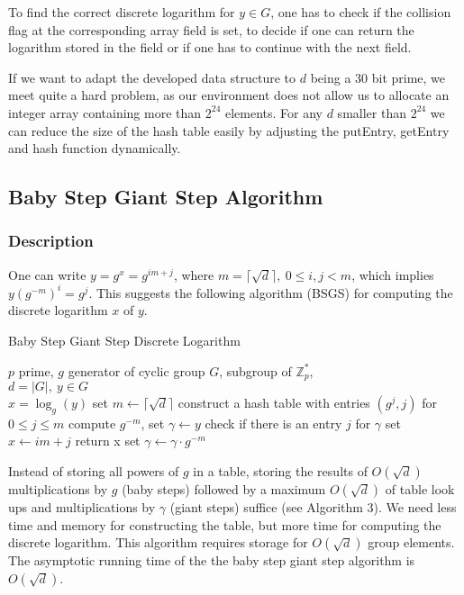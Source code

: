 \documentclass[a4paper, 11pt]{article}
\begin{document}
 To find the correct discrete logarithm for $y \in G$, one has to check if the collision flag at the corresponding array field is set, to decide if one can return the logarithm stored in the field or if one has to continue 
 with the next field. 
 
 If we want to adapt the developed data structure to $d$ being a 30 bit prime, we meet quite a hard problem, as our environment does not allow us to allocate an integer array containing more than $2^{24}$ elements. For any $d$ smaller than $2^{24}$ we can reduce the size of the hash table easily by adjusting the putEntry, getEntry and hash function dynamically. 
 
 \subsection{Baby Step Giant Step Algorithm} 
 \subsubsection{Description} 
 One can write $y=g^x=g^{im+j}$, where $m = \lceil \sqrt d \rceil,~ 0 \le i,j < m$, which implies $y(g^{-m})^i = g^{j}$. This suggests the following algorithm (BSGS) for computing the discrete logarithm $x$  of $y$.
 
 \begin{algorithm}[htb] 
 \caption{Baby Step Giant Step Discrete Logarithm} 
 \label{alg3} 
 \begin{algorithmic}[1] 
 \REQUIRE $p$ prime, $g$ generator of cyclic group $G$, subgroup of $\mathbb{Z}^{*}_p$,\\$d = |G|, ~y \in G$\\ 
 \ENSURE $x = \log_g(y)$ 
 \STATE set $m \gets \lceil \sqrt d \rceil$ 
 \STATE construct a hash table with entries $(g^j,j)$ for $0 \le j \le m$ 
 \STATE compute $ g^{-m}$, set $\gamma \gets y$ 
 \STATE check if there is an entry $j$ for $\gamma$ 
 \STATE set $x \gets im + j$ 
 \STATE return x
 \ENDIF
 \STATE set $\gamma \gets \gamma \cdot g^{-m}$ 
 \ENDFOR 
 \end{algorithmic} 
 \end{algorithm}  
 Instead of storing all powers of $g$ in a table, storing the results of $O(\sqrt d)$  multiplications by $g$ (baby steps) 
 followed by a maximum $O(\sqrt d)$ of table look ups and multiplications by $\gamma$ (giant steps)  suffice (see Algorithm 3). We need less time and memory for constructing the table, but more time for computing the discrete logarithm. 
 This algorithm requires storage for $O(\sqrt d)$ group elements. The asymptotic running time of the the baby step giant step algorithm is $O(\sqrt d)$.
 
\end{document}
